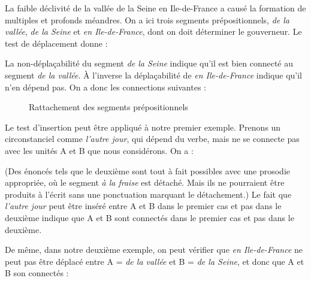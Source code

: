 \ea La faible déclivité de la vallée de la Seine en Ile-de-France a causé la formation de multiples et profonds méandres. \z
On a ici trois segments prépositionnels, \textit{de la vallée}, \textit{de la Seine} et \textit{en Ile-de-France}, dont on doit déterminer le gouverneur. Le test de déplacement donne :

\ea
  \z
\z
La non-déplaçabilité du segment \textit{de la Seine} indique qu’il est bien connecté au segment \textit{de la vallée}. À l’inverse la déplaçabilité de \textit{en Ile-de-France} indique qu’il n’en dépend pas. On a donc les connections suivantes :

\begin{figure}
\small{}
\caption{\label{fig:}Rattachement des segments prépositionnels}
\end{figure}

Le test d’insertion peut être appliqué à notre premier exemple. Prenons un circonstanciel comme \textit{l’autre jour}, qui dépend du verbe, mais ne se connecte pas avec les unités A et B que nous considérons. On a :

\ea
  \z
\z
(Des énoncés tels que le deuxième sont tout à fait possibles avec une prosodie appropriée, où le segment \textit{à la fraise} est détaché. Mais ils ne pourraient être produits à l’écrit sans une ponctuation marquant le détachement.) Le fait que \textit{l’autre jour} peut être inséré entre A et B dans le premier cas et pas dans le deuxième indique que A et B sont connectés dans le premier cas et pas dans le deuxième.

De même, dans notre deuxième exemple, on peut vérifier que \textit{en Ile-de-France} ne peut pas être déplacé entre A = \textit{de la vallée} et B = \textit{de la Seine}, et donc que A et B son connectés :

